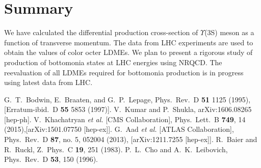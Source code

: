 \documentclass[twocolumn,amsmath,amssymb]{snp}
\begin{document}
\section*{Summary}
We have calculated the differential production cross-section of $\Upsilon$(3S) meson
as a function of transverse momentum. The data from LHC experiments are used to 
obtain the values of color octer LDMEs. We plan to present a rigorous study of 
production of bottomonia states at LHC energies using NRQCD. The reevaluation of all LDMEs 
required for bottomonia production is in progress using latest data from LHC.         
\begin{thebibliography}{50}
G.~T.~Bodwin, E.~Braaten, and G.~P.~Lepage,
Phys.\ Rev.\ D {\bf 51} 1125 (1995), 
[Erratum-ibid.\ D {\bf 55} 5853 (1997)].
  V.~Kumar and P.~Shukla,
  arXiv:1606.08265 [hep-ph].
  V.~Khachatryan {\it et al.} [CMS Collaboration],
  Phys.\ Lett.\ B {\bf 749}, 14 (2015),[arXiv:1501.07750 [hep-ex]].
  G.~Aad {\it et al.} [ATLAS Collaboration],
  Phys.\ Rev.\ D {\bf 87}, no. 5, 052004 (2013),
  [arXiv:1211.7255 [hep-ex]].
  R.~Baier and R.~Ruckl,
  Z.\ Phys.\ C {\bf 19}, 251 (1983).
  P.~L.~Cho and A.~K.~Leibovich,
  Phys.\ Rev.\ D {\bf 53}, 150 (1996).

\end{thebibliography}
\end{document}
